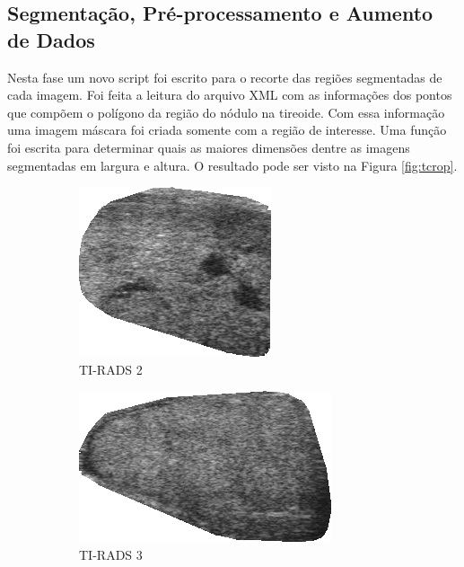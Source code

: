 \documentclass[12pt]{article}
\begin{document}
\subsection{Segmentação, Pré-processamento e Aumento de Dados}
Nesta fase um novo script foi escrito para o recorte das regiões segmentadas de cada imagem. Foi feita a leitura do arquivo XML com as informações dos pontos que compõem o polígono da região do nódulo na tireoide. Com essa informação uma imagem máscara foi criada somente com a região de interesse. Uma função foi escrita para determinar quais as maiores dimensões dentre as imagens segmentadas em largura e altura. O resultado pode ser visto na Figura \ref{fig:tcrop}.

\begin{figure}[t]
\centering
\caption{Exemplo das imagens segmentadas em função do nódulo tireoidiano.}
\begin{subfigure}[t]{.3\textwidth}
  \centering
  \includegraphics[width=.6\linewidth]{images/t_2_crop.png}
  \caption{TI-RADS 2}
  \label{fig:t2c}
\end{subfigure}
\hfill
\begin{subfigure}[t]{.3\textwidth}
  \centering
  \includegraphics[width=.6\linewidth]{images/t_3_crop.png}
  \caption{TI-RADS 3}
  \label{fig:t3c}
\end{subfigure}
\hfill
\begin{subfigure}[t]{.3\textwidth}

\end{subfigure}
\end{figure}
\end{document}
